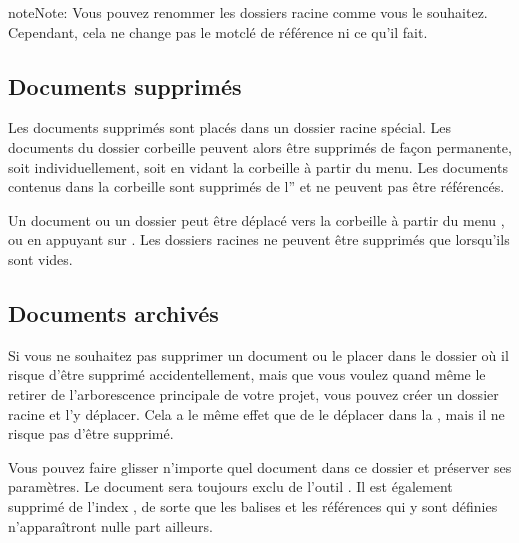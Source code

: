 \documentclass[a4paper,11pt,french]{sphinxmanual}
\begin{document}
\begin{sphinxadmonition}{note}{Note:}
\sphinxAtStartPar
Vous pouvez renommer les dossiers racine comme vous le souhaitez. Cependant, cela ne change pas le mot\sphinxhyphen{}clé de référence ni ce qu’il fait.
\end{sphinxadmonition}


\subsection{Documents supprimés}
\label{\detokenize{project_overview:deleted-documents}}\label{\detokenize{project_overview:a-proj-roots-del}}
\sphinxAtStartPar
Les documents supprimés sont placés dans un dossier racine  spécial. Les documents du dossier corbeille peuvent alors être supprimés de façon permanente, soit individuellement, soit en vidant la corbeille à partir du menu. Les documents contenus dans la corbeille sont supprimés de l”{\hyperref[\detokenize{int_glossary:term-Project-Index}]{}} et ne peuvent pas être référencés.

\sphinxAtStartPar
Un document ou un dossier peut être déplacé vers la corbeille à partir du menu , ou en appuyant sur . Les dossiers racines ne peuvent être supprimés que lorsqu’ils sont vides.


\subsection{Documents archivés}
\label{\detokenize{project_overview:archived-documents}}\label{\detokenize{project_overview:a-proj-roots-out}}
\sphinxAtStartPar
Si vous ne souhaitez pas supprimer un document ou le placer dans le dossier  où il risque d’être supprimé accidentellement, mais que vous voulez quand même le retirer de l’arborescence principale de votre projet, vous pouvez créer un dossier racine  et l’y déplacer. Cela a le même effet que de le déplacer dans la , mais il ne risque pas d’être supprimé.

\sphinxAtStartPar
Vous pouvez faire glisser n’importe quel document dans ce dossier et préserver ses paramètres. Le document sera toujours exclu de l’outil . Il est également supprimé de l’index {\hyperref[\detokenize{int_glossary:term-Project-Index}]{}}, de sorte que les balises et les références qui y sont définies n’apparaîtront nulle part ailleurs.
\end{document}
